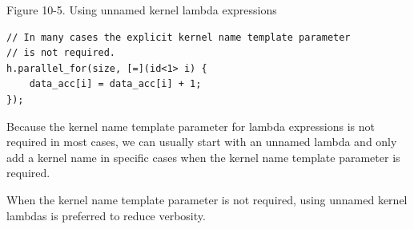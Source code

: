 \hspace*{\fill} \par %
Figure 10-5. Using unnamed kernel lambda expressions
\begin{lstlisting}[caption={}]
// In many cases the explicit kernel name template parameter
// is not required.
h.parallel_for(size, [=](id<1> i) {
	data_acc[i] = data_acc[i] + 1;
});
\end{lstlisting}

Because the kernel name template parameter for lambda expressions is not required in most cases, we can usually start with an unnamed lambda and only add a kernel name in specific cases when the kernel name template parameter is required.\par

\begin{tcolorbox}[colback=red!5!white,colframe=red!75!black]
When the kernel name template parameter is not required, using unnamed kernel lambdas is preferred to reduce verbosity.
\end{tcolorbox}



















